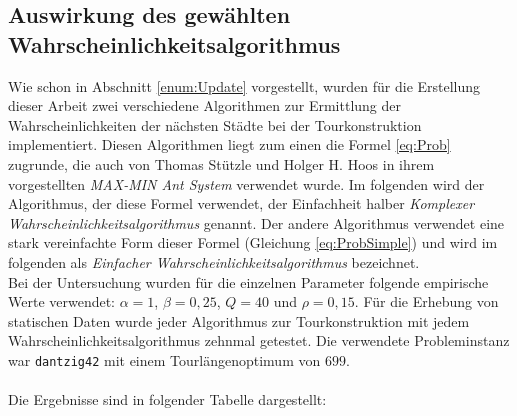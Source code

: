 \documentclass[doktyp=barbeit, sprache=german]{TUBAFarbeiten}
\begin{document}
\subsection{Auswirkung des gewählten Wahrscheinlichkeitsalgorithmus}
Wie schon in Abschnitt \ref{enum:Update} vorgestellt, wurden für die Erstellung dieser Arbeit zwei verschiedene Algorithmen zur Ermittlung der Wahrscheinlichkeiten der nächsten Städte bei der Tourkonstruktion implementiert. Diesen Algorithmen liegt zum einen die Formel \ref{eq:Prob} zugrunde, die auch von Thomas Stützle und Holger H. Hoos in ihrem vorgestellten \textit{MAX-MIN Ant System} verwendet wurde. Im folgenden wird der Algorithmus, der diese Formel verwendet, der Einfachheit halber \textit{Komplexer Wahrscheinlichkeitsalgorithmus} genannt. Der andere Algorithmus verwendet eine stark vereinfachte Form dieser Formel (Gleichung \ref{eq:ProbSimple}) und wird im folgenden als \textit{Einfacher Wahrscheinlichkeitsalgorithmus} bezeichnet.
\\Bei der Untersuchung wurden für die einzelnen Parameter folgende empirische Werte verwendet: $\alpha = 1$, $\beta = 0,25$, $Q = 40$ und $\rho = 0,15$. Für die Erhebung von statischen Daten wurde jeder Algorithmus zur Tourkonstruktion mit jedem Wahrscheinlichkeitsalgorithmus zehnmal getestet. Die verwendete Probleminstanz war \texttt{dantzig42} mit einem Tourlängenoptimum von $699$.
\\\\Die Ergebnisse sind in folgender Tabelle dargestellt:
\begin{table}[]
\captionsetup{justification=centering}
\centering
{}
\caption{Ergebnisse für die einzelnen in Algorithmen in Abhängigkeit von dem gewählten Wahrscheinlichkeitsalgorithmus. Die Prozentzahl hinter der Tourlänge zeigt die Abweichung vom Tourlängenoptimum $d = 699$ an}
\label{table:Prob}
\end{table}
\end{document}
